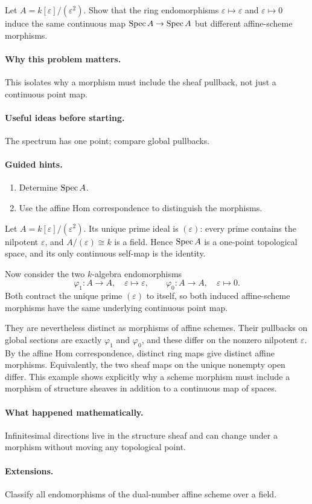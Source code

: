 \begin{problem}\label{prob:vi19-p17}
Let $A=k[\varepsilon]/(\varepsilon^2)$. Show that the ring endomorphisms $\varepsilon\mapsto\varepsilon$ and $\varepsilon\mapsto0$ induce the same continuous map $\operatorname{Spec} A\to\operatorname{Spec} A$ but different affine-scheme morphisms.
\end{problem}

\ifdefined\FullProblemDossiers
\paragraph{Why this problem matters.}
This isolates why a morphism must include the sheaf pullback, not just a continuous point map.

\paragraph{Useful ideas before starting.}
The spectrum has one point; compare global pullbacks.

\paragraph{Guided hints.}
\begin{enumerate}
\item Determine $\operatorname{Spec} A$.
\item Use the affine Hom correspondence to distinguish the morphisms.
\end{enumerate}

\begin{solution}
Let \(A=k[\varepsilon]/(\varepsilon^2)\).  Its unique prime ideal is \((\varepsilon)\): every prime contains the nilpotent \(\varepsilon\), and \(A/(\varepsilon)\cong k\) is a field.  Hence \(\operatorname{Spec} A\) is a one-point topological space, and its only continuous self-map is the identity.

Now consider the two \(k\)-algebra endomorphisms
\[
\varphi_1:A\to A,\quad\varepsilon\mapsto\varepsilon,
\qquad
\varphi_0:A\to A,\quad\varepsilon\mapsto0.
\]
Both contract the unique prime \((\varepsilon)\) to itself, so both induced affine-scheme morphisms have the same underlying continuous point map.

They are nevertheless distinct as morphisms of affine schemes.  Their pullbacks on global sections are exactly \(\varphi_1\) and \(\varphi_0\), and these differ on the nonzero nilpotent \(\varepsilon\).  By the affine Hom correspondence, distinct ring maps give distinct affine morphisms.  Equivalently, the two sheaf maps on the unique nonempty open differ.  This example shows explicitly why a scheme morphism must include a morphism of structure sheaves in addition to a continuous map of spaces.
\end{solution}

\paragraph{What happened mathematically.}
Infinitesimal directions live in the structure sheaf and can change under a morphism without moving any topological point.

\paragraph{Extensions.}
Classify all endomorphisms of the dual-number affine scheme over a field.
\fi
